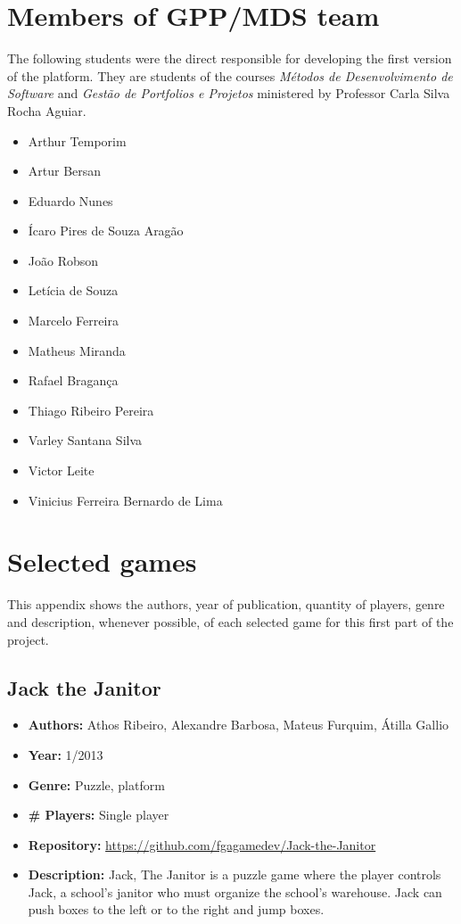 \begin{apendicesenv}

\partapendices

\chapter{Members of GPP/MDS team}
\label {sec:members_gpp_mds}

The following students were the direct responsible for developing the first version of the platform. They are students of the courses \textit{M\'etodos de Desenvolvimento de Software} and \textit{Gest\~ao de Portfolios e Projetos} ministered by Professor Carla Silva Rocha Aguiar.

\begin{itemize}
\item Arthur Temporim
\item Artur Bersan
\item Eduardo Nunes
\item Ícaro Pires de Souza Aragão
\item João Robson
\item Letícia de Souza
\item Marcelo Ferreira
\item Matheus Miranda
\item Rafael Bragança
\item Thiago Ribeiro Pereira
\item Varley Santana Silva
\item Victor Leite
\item Vinicius Ferreira Bernardo de Lima
\end{itemize}

\chapter{Selected games}
\label {sec:selected_games}

This appendix shows the authors, year of publication, quantity of players, genre and description, whenever possible, of each selected game for this first part of the project.

\section{Jack the Janitor}
\label {sec:jack_the_janitor}

\begin{itemize}
\item[] \textbf{Authors:} Athos Ribeiro, Alexandre Barbosa, Mateus Furquim, Átilla Gallio
\item[] \textbf{Year:} 1/2013
\item[] \textbf{Genre:} Puzzle, platform
\item[] \textbf{\# Players:} Single player
\item[] \textbf{Repository:} \url{https://github.com/fgagamedev/Jack-the-Janitor}
\item[] \textbf{Description\footnotemark:} Jack, The Janitor is a puzzle game where the player controls Jack, a school's janitor who must organize the school's warehouse. Jack can push boxes to the left or to the right and jump boxes.


\end{itemize}
\end{apendicesenv}
